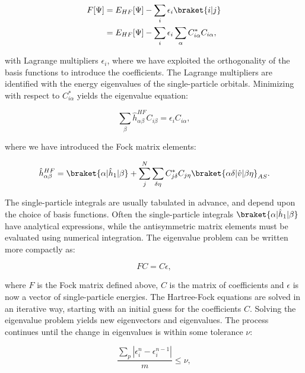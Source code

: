 \begin{equation}
\begin{split}
F[\Psi] &= E_{HF}[\Psi] - \sum_i \epsilon_i \braket{i | j} \\
        &= E_{HF}[\Psi] - \sum_i \epsilon_i \sum_{\alpha}
        C_{i\alpha}^* C_{i\alpha} ,
\end{split}
\end{equation}

with Lagrange multipliers $\epsilon_i$, where we have
exploited the orthogonality of the basis functions to
introduce the coefficients. The Lagrange multipliers
are identified with the energy eigenvalues
of the single-particle orbitals.
Minimizing with respect to $C_{i\alpha}^*$ yields
the eigenvalue equation:

\begin{equation}
\sum_{\beta} \hat{h}_{\alpha\beta}^{HF} C_{i\beta}
= \epsilon_i C_{i\alpha} ,
\end{equation}

where we have introduced the Fock matrix elements:

\begin{equation}
\hat{h}_{\alpha\beta}^{HF} =
\braket{\alpha | \hat{h}_1 | \beta}
+ \sum_{j}^N \sum_{\delta\eta} C_{j\delta}^* C_{j\eta}
\braket{\alpha\delta | \hat{v} | \beta\eta}_{AS} .
\end{equation}

The single-particle integrals are usually tabulated
in advance, and depend upon the choice of basis functions.
Often the single-particle integrals $\braket{\alpha | \hat{h}_1 | \beta}$
have analytical expressions, while the antisymmetric matrix elements
must be evaluated using numerical integration.
The eigenvalue problem can be written more compactly as:

\begin{equation}
FC = C\epsilon ,
\end{equation}

where $F$ is the Fock matrix defined above, $C$ is the matrix
of coefficients and $\epsilon$ is now
a vector of single-particle energies.
The Hartree-Fock equations are solved in an iterative way,
starting with an initial guess for the coefficients $C$.
Solving the eigenvalue problem yields new eigenvectors
and eigenvalues.
The process continues until the change in eigenvalues
is within some tolerance $\nu$:

\begin{equation}
\frac{\sum_p \left| \epsilon_i^n - \epsilon_i^{n-1} \right|}
{m} \leq \nu ,
\end{equation}

